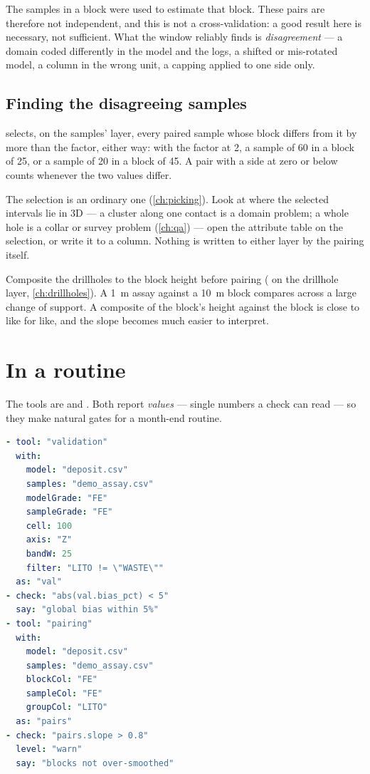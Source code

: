 \begin{caution}
The samples in a block were used to estimate that block. These pairs are therefore not independent, and this is not a cross-validation: a good result here is necessary, not sufficient. What the window reliably finds is \emph{disagreement} — a domain coded differently in the model and the logs, a shifted or mis-rotated model, a column in the wrong unit, a capping applied to one side only.
\end{caution}

\subsection{Finding the disagreeing samples}
 selects, on the samples' layer, every paired sample whose block differs from it by more than the factor, either way: with the factor at 2, a sample of 60 in a block of 25, or a sample of 20 in a block of 45. A pair with a side at zero or below counts whenever the two values differ.

The selection is an ordinary one (\cref{ch:picking}). Look at where the selected intervals lie in 3D — a cluster along one contact is a domain problem; a whole hole is a collar or survey problem (\cref{ch:qa}) — open the attribute table on the selection, or write it to a column. Nothing is written to either layer by the pairing itself.

\begin{tip}
Composite the drillholes to the block height before pairing ( on the drillhole layer, \cref{ch:drillholes}). A 1~m assay against a 10~m block compares across a large change of support. A composite of the block's height against the block is close to like for like, and the slope becomes much easier to interpret.
\end{tip}

\section{In a routine}\label{sec:validation-routine}
The tools are  and . Both report \emph{values} — single numbers a check can read — so they make natural gates for a month-end routine.

\begin{lstlisting}[language=yaml]
- tool: "validation"
  with:
    model: "deposit.csv"
    samples: "demo_assay.csv"
    modelGrade: "FE"
    sampleGrade: "FE"
    cell: 100
    axis: "Z"
    bandW: 25
    filter: "LITO != \"WASTE\""
  as: "val"
- check: "abs(val.bias_pct) < 5"
  say: "global bias within 5%"
- tool: "pairing"
  with:
    model: "deposit.csv"
    samples: "demo_assay.csv"
    blockCol: "FE"
    sampleCol: "FE"
    groupCol: "LITO"
  as: "pairs"
- check: "pairs.slope > 0.8"
  level: "warn"
  say: "blocks not over-smoothed"
\end{lstlisting}

